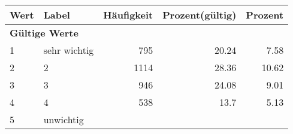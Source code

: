      \begin{longtable}{lXrrr}
     \toprule
     \textbf{Wert} & \textbf{Label} & \textbf{Häufigkeit} & \textbf{Prozent(gültig)} & \textbf{Prozent} \\
     \endhead
     \midrule
     \multicolumn{5}{l}{\textbf{Gültige Werte}}\\

     1 &
     \multicolumn{1}{X}{ sehr wichtig   } &


       \num{795} &
       \num[round-mode=places,round-precision=2]{20.24} &
         \num[round-mode=places,round-precision=2]{7.58} \\

     2 &
     \multicolumn{1}{X}{ 2   } &


       \num{1114} &
       \num[round-mode=places,round-precision=2]{28.36} &
         \num[round-mode=places,round-precision=2]{10.62} \\

     3 &
     \multicolumn{1}{X}{ 3   } &


       \num{946} &
       \num[round-mode=places,round-precision=2]{24.08} &
         \num[round-mode=places,round-precision=2]{9.01} \\

     4 &
     \multicolumn{1}{X}{ 4   } &


       \num{538} &
       \num[round-mode=places,round-precision=2]{13.7} &
         \num[round-mode=places,round-precision=2]{5.13} \\

     5 &
     \multicolumn{1}{X}{ unwichtig   } &



\end{longtable}
